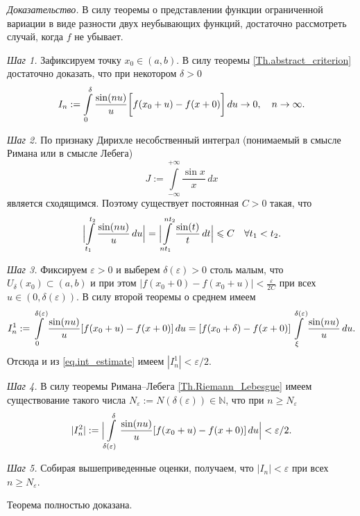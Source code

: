 \textit{Доказательство.}
В силу теоремы о представлении функции ограниченной вариации в виде разности двух неубывающих функций, достаточно рассмотреть случай, когда $f$ не убывает.

\textit{Шаг 1.} Зафиксируем точку $x_{0} \in (a,b)$.
В силу теоремы \ref{Th.abstract_criterion} достаточно доказать, что при некотором $\delta > 0$
\begin{equation}
	\notag
	I_{n}:=\int\limits_{0}^{\delta}\frac{\sin(nu)}{u}\bigg[f(x_{0}+u)-f(x+0)\bigg]\,du \to 0, \quad n \to \infty.
\end{equation}


\textit{Шаг 2.} По признаку Дирихле несобственный интеграл (понимаемый в смысле Римана или в смысле Лебега)
$$
J:=\int\limits_{-\infty}^{+\infty}\frac{\sin x}{x}\,dx
$$
является сходящимся.
Поэтому существует постоянная $C > 0$ такая, что
\begin{equation}
	\label{eq.int_estimate}
	\Bigl|\int\limits_{t_{1}}^{t_{2}}\frac{\sin(nu)}{u}\,du\Bigr| = \Bigl|\int\limits_{nt_{1}}^{nt_{2}}\frac{\sin(t)}{t}\,dt\Bigr| \le C \quad \forall t_{1} < t_{2}.
\end{equation}

\textit{Шаг 3.} Фиксируем $\varepsilon > 0$ и выберем $\delta(\varepsilon) > 0$ столь малым, что $U_{\delta}(x_{0}) \subset (a,b)$ и при этом $|f(x_{0}+0)-f(x_{0}+u)| < \frac{\varepsilon}{2C}$
при всех $u \in (0,\delta(\varepsilon))$.
В силу второй теоремы о среднем имеем
\begin{equation}
	\notag
	I^{1}_{n}:=\int\limits_{0}^{\delta(\varepsilon)}\frac{\sin(nu)}{u}[f(x_{0}+u)-f(x+0)]\,du =
	[f(x_{0}+\delta)-f(x+0)]\int\limits_{\xi}^{\delta(\varepsilon)}\frac{\sin(nu)}{u}\,du.
\end{equation}
Отсюда и из \eqref{eq.int_estimate} имеем $|I_{n}^{1}| < \varepsilon/2$.


\textit{Шаг 4.}
В силу теоремы Римана--Лебега \ref{Th.Riemann_Lebesgue} имеем существование такого числа $N_{\varepsilon}:=N(\delta(\varepsilon)) \in \mathbb{N}$, что при $n \geq N_{\varepsilon}$
\begin{equation}
	\notag
	|I_{n}^{2}|:=\Bigl|\int\limits_{\delta(\varepsilon)}^{\delta}\frac{\sin(nu)}{u}[f(x_{0}+u)-f(x+0)]\,du\Bigr| < \varepsilon/2.
\end{equation}

\textit{Шаг 5.} Собирая вышеприведенные оценки, получаем, что $|I_{n}| < \varepsilon$ при всех $n \geq N_{\varepsilon}$.

Теорема полностью доказана.

